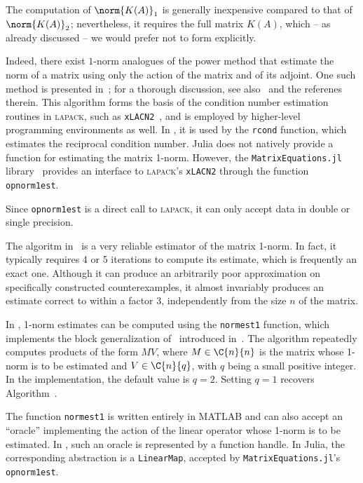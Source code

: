 The computation of $\norm{K(A)}_1$ is generally inexpensive compared to that of $\norm{K(A)}_2$; nevertheless, it requires the full matrix $K(A)$, which -- as already discussed -- we would prefer not to form explicitly.

Indeed, there exist $1$-norm analogues of the power method that estimate the norm of a matrix using only the action of the matrix and of its adjoint. 
One such method is presented in~\cite[Alg.~3.21]{higham:matfun_book}; for a thorough discussion, see also~\cite[§~15.3]{higham:accuracy_book} and the referenes therein. This algorithm forms the basis of the condition number estimation routines in \textsc{lapack}, such as \texttt{xLACN2}~\cite{lapack:book}, and is employed by higher-level programming environments as well. In \matlab{}, it is used by the \texttt{rcond} function, which estimates the reciprocal condition number. Julia does not natively provide a function for estimating the matrix 1-norm. However, the \texttt{MatrixEquations.jl} library~\cite{sw:MatrixEquations} provides an interface to \textsc{lapack}'s \texttt{xLACN2} through the function \texttt{opnorm1est}.

\begin{oss*}
	Since \texttt{opnorm1est} is a direct call to \textsc{lapack}, it can only accept data in double or single precision.
\end{oss*}

The algoritm in~\cite[Alg.~3.21]{higham:matfun_book} is a very reliable estimator of the matrix 1-norm. In fact, it typically requires 4 or 5 iterations to compute its estimate, which is frequently an exact one. Although it can produce an arbitrarily poor approximation on specifically constructed counterexamples, it almost invariably produces an estimate correct to within a factor $3$, independently from the size $n$ of the matrix.

In \matlab{}, 1-norm estimates can be computed using the \texttt{normest1} function, which implements the block generalization of~\cite[Alg.~3.21]{higham:matfun_book} introduced in~\cite{higham:hiti_normest1}. The algorithm repeatedly computes products of the form $MV$, where $M\in\C{n}{n}$ is the matrix whose 1-norm is to be estimated and $V\in\C{n}{q}$, with $q$ being a small positive integer. In the \matlab{} implementation, the default value is $q=2$. Setting $q=1$ recovers Algorithm~\cite[Alg.~3.21]{higham:matfun_book}. 

The function \texttt{normest1} is written entirely in MATLAB and can also accept an ``oracle'' implementing the action of the linear operator whose 1-norm is to be estimated. In \matlab{}, such an oracle is represented by a function handle. In Julia, the corresponding abstraction is a \texttt{LinearMap}, accepted by \texttt{MatrixEquations.jl}'s \texttt{opnorm1est}.
  
